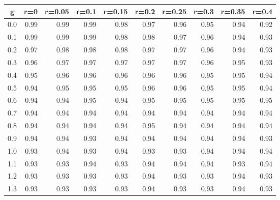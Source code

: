 %
\begin{table}[!tbp]
 \begin{center}
 \begin{tabular}{rrrrrrrrrr}\hline\hline
\multicolumn{1}{c}{g}&\multicolumn{1}{c}{r=0}&\multicolumn{1}{c}{r=0.05}&\multicolumn{1}{c}{r=0.1}&\multicolumn{1}{c}{r=0.15}&\multicolumn{1}{c}{r=0.2}&\multicolumn{1}{c}{r=0.25}&\multicolumn{1}{c}{r=0.3}&\multicolumn{1}{c}{r=0.35}&\multicolumn{1}{c}{r=0.4}\tabularnewline
\hline
0.0&0.99&0.99&0.99&0.98&0.97&0.96&0.95&0.94&0.92\tabularnewline
0.1&0.99&0.99&0.99&0.98&0.98&0.97&0.96&0.94&0.93\tabularnewline
0.2&0.97&0.98&0.98&0.98&0.97&0.97&0.96&0.94&0.93\tabularnewline
0.3&0.96&0.97&0.97&0.97&0.97&0.97&0.96&0.95&0.93\tabularnewline
0.4&0.95&0.96&0.96&0.96&0.96&0.96&0.95&0.95&0.94\tabularnewline
0.5&0.94&0.95&0.95&0.95&0.96&0.96&0.95&0.95&0.94\tabularnewline
0.6&0.94&0.94&0.95&0.94&0.95&0.95&0.95&0.95&0.95\tabularnewline
0.7&0.94&0.94&0.94&0.94&0.94&0.94&0.94&0.94&0.94\tabularnewline
0.8&0.94&0.94&0.94&0.94&0.95&0.94&0.94&0.94&0.94\tabularnewline
0.9&0.94&0.94&0.93&0.94&0.94&0.94&0.94&0.94&0.93\tabularnewline
1.0&0.93&0.94&0.93&0.94&0.93&0.93&0.94&0.94&0.94\tabularnewline
1.1&0.93&0.93&0.94&0.93&0.94&0.94&0.94&0.93&0.94\tabularnewline
1.2&0.93&0.93&0.93&0.93&0.94&0.93&0.93&0.94&0.93\tabularnewline
1.3&0.93&0.93&0.93&0.93&0.94&0.93&0.93&0.94&0.93\tabularnewline
\hline
\end{tabular}

\end{center}

\end{table}


